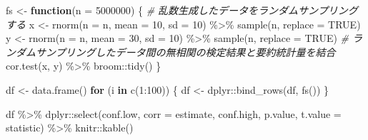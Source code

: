 \documentclass[]{tufte-handout}
\newenvironment{Shaded}{}{}
\newcommand{\AttributeTok}[1]{\textcolor[rgb]{0.49,0.56,0.16}{#1}}
\newcommand{\CommentTok}[1]{\textcolor[rgb]{0.38,0.63,0.69}{\textit{#1}}}
\newcommand{\ConstantTok}[1]{\textcolor[rgb]{0.53,0.00,0.00}{#1}}
\newcommand{\ControlFlowTok}[1]{\textcolor[rgb]{0.00,0.44,0.13}{\textbf{#1}}}
\newcommand{\DecValTok}[1]{\textcolor[rgb]{0.25,0.63,0.44}{#1}}
\newcommand{\FunctionTok}[1]{\textcolor[rgb]{0.02,0.16,0.49}{#1}}
\newcommand{\NormalTok}[1]{#1}
\newcommand{\OtherTok}[1]{\textcolor[rgb]{0.00,0.44,0.13}{#1}}
\newcommand{\SpecialCharTok}[1]{\textcolor[rgb]{0.25,0.44,0.63}{#1}}
\begin{document}
\begin{Shaded}
\begin{Highlighting}[numbers=left,,]
\NormalTok{fs }\OtherTok{\textless{}{-}} \ControlFlowTok{function}\NormalTok{(}\AttributeTok{n =} \DecValTok{5000000}\NormalTok{) \{}
  \CommentTok{\# 乱数生成したデータをランダムサンプリングする}
\NormalTok{  x }\OtherTok{\textless{}{-}} \FunctionTok{rnorm}\NormalTok{(}\AttributeTok{n =}\NormalTok{ n, }\AttributeTok{mean =} \DecValTok{10}\NormalTok{, }\AttributeTok{sd =} \DecValTok{10}\NormalTok{) }\SpecialCharTok{\%\textgreater{}\%} \FunctionTok{sample}\NormalTok{(n, }\AttributeTok{replace =} \ConstantTok{TRUE}\NormalTok{)}
\NormalTok{  y }\OtherTok{\textless{}{-}} \FunctionTok{rnorm}\NormalTok{(}\AttributeTok{n =}\NormalTok{ n, }\AttributeTok{mean =} \DecValTok{30}\NormalTok{, }\AttributeTok{sd =} \DecValTok{10}\NormalTok{) }\SpecialCharTok{\%\textgreater{}\%} \FunctionTok{sample}\NormalTok{(n, }\AttributeTok{replace =} \ConstantTok{TRUE}\NormalTok{)}
  \CommentTok{\# ランダムサンプリングしたデータ間の無相関の検定結果と要約統計量を結合}
  \FunctionTok{cor.test}\NormalTok{(x, y) }\SpecialCharTok{\%\textgreater{}\%}\NormalTok{ broom}\SpecialCharTok{::}\FunctionTok{tidy}\NormalTok{()}
\NormalTok{\}}

\NormalTok{df }\OtherTok{\textless{}{-}} \FunctionTok{data.frame}\NormalTok{()}
\ControlFlowTok{for}\NormalTok{ (i }\ControlFlowTok{in} \FunctionTok{c}\NormalTok{(}\DecValTok{1}\SpecialCharTok{:}\DecValTok{100}\NormalTok{)) \{}
\NormalTok{  df }\OtherTok{\textless{}{-}}\NormalTok{ dplyr}\SpecialCharTok{::}\FunctionTok{bind\_rows}\NormalTok{(df, }\FunctionTok{fs}\NormalTok{())}
\NormalTok{\}}

\NormalTok{df }\SpecialCharTok{\%\textgreater{}\%} 
\NormalTok{  dplyr}\SpecialCharTok{::}\FunctionTok{select}\NormalTok{(conf.low, }\AttributeTok{corr =}\NormalTok{ estimate, conf.high,}
\NormalTok{                p.value, }\AttributeTok{t.value =}\NormalTok{ statistic) }\SpecialCharTok{\%\textgreater{}\%} 
\NormalTok{  knitr}\SpecialCharTok{::}\FunctionTok{kable}\NormalTok{()}
\end{Highlighting}
\end{Shaded}
\end{document}
